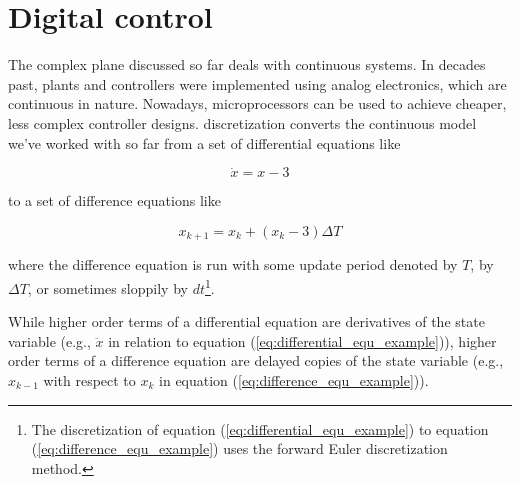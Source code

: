
\chapter{Digital control} \label{ch:digital_control}

The complex plane discussed so far deals with continuous \glspl{system}. In
decades past, \glspl{plant} and controllers were implemented using analog
electronics, which are continuous in nature. Nowadays, microprocessors can be
used to achieve cheaper, less complex controller designs. \Gls{discretization}
converts the continuous \gls{model} we've worked with so far from a set of
differential equations like

\begin{equation}
  \dot{x} = x - 3 \label{eq:differential_equ_example}
\end{equation}

to a set of difference equations like

\begin{equation}
  x_{k+1} = x_k + (x_k - 3) \Delta T \label{eq:difference_equ_example}
\end{equation}

where the difference equation is run with some update period denoted by $T$, by
$\Delta T$, or sometimes sloppily by $dt$\footnote{The discretization of
equation (\ref{eq:differential_equ_example}) to equation
(\ref{eq:difference_equ_example}) uses the forward Euler discretization
method.}.

While higher order terms of a differential equation are derivatives of the
\gls{state} variable (e.g., $\ddot{x}$ in relation to equation
(\ref{eq:differential_equ_example})), higher order terms of a difference
equation are delayed copies of the \gls{state} variable (e.g., $x_{k-1}$ with
respect to $x_k$ in equation (\ref{eq:difference_equ_example})).

\renewcommand*{\chapterpath}{\partpath/digital-control}







